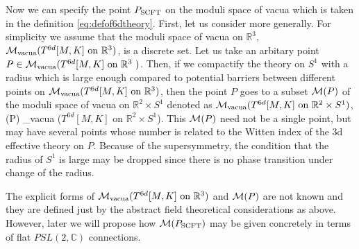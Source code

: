 \documentclass[a4paper,11pt]{article}
\def\CM{{\cal M}}
\def\BC{{\mathbb C}}
\def\BR{{\mathbb R}}
\def\beq#1\eeq{\begin{align}#1\end{align}}
\begin{document}
Now we can specify the point $P_{\rm SCFT}$ on the moduli space of vacua which is taken in the definition \eqref{eq:defof6dtheory}.
First, let us consider more generally. For simplicity we assume that the moduli space of vacua on $\BR^3$,
$\mathcal{M}_{\rm vacua} (\textrm{$T^{6d}[M,K]$ on $\mathbb{R}^3$}) $, is a discrete set. 
Let us take an arbitary point $P \in \mathcal{M}_{\rm vacua} (\textrm{$T^{6d}[M,K]$ on $\mathbb{R}^3$ }) $.
Then, if we compactify the theory on $S^1$ with a radius which is large enough compared to potential barriers between different points on 
$\mathcal{M}_{\rm vacua} (\textrm{$T^{6d}[M,K]$ on $\mathbb{R}^3$}) $, then the point $P$ goes to a subset $\CM(P)$ of 
the moduli space of vacua on $\BR^2 \times S^1$ denoted as $\mathcal{M}_{\rm vacua} (\textrm{$T^{6d}[M,K]$ on $\mathbb{R}^2\times S^1$})$, 
\beq
P \to \CM(P) \subset {}_{\rm vacua} (\textrm{$T^{6d}[M,K]$ on $\mathbb{R}^2\times S^1$}).
\eeq
This $\CM(P)$ need not be a single point, but may have several points whose number is related to the Witten index of the 3d effective theory on $P$.
Because of the supersymmetry, the condition that the radius of $S^1$ is large may be dropped since there is no phase transition under  change of the radius.

The explicit forms of $\mathcal{M}_{\rm vacua} (\textrm{$T^{6d}[M,K]$ on $\mathbb{R}^3$}) $ and $\CM(P)$ are not known
and they are defined just by the abstract field theoretical considerations as above.
However, later we will propose how $\CM(P_{\rm SCFT})$ may be given concretely in terms of flat $PSL(2,\BC)$ connections.
\end{document}

